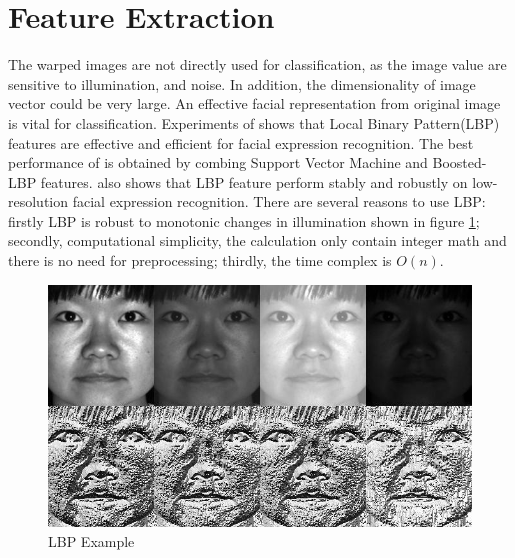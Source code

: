 \section{Feature Extraction}
The warped images are not directly used for classification, as the image value are sensitive to illumination, and noise. In addition, the dimensionality of image vector could be very large. An effective facial representation from original image is vital for classification. Experiments of \cite{shan2009facial} shows that Local Binary Pattern(LBP) features are effective and efficient for facial expression recognition. The best performance of \cite{shan2009facial} is obtained by combing Support Vector Machine and Boosted-LBP features. \cite{shan2009facial} also shows that LBP feature perform stably and robustly on low-resolution facial expression recognition. There are several reasons to use LBP: firstly LBP is robust to monotonic changes in illumination shown in figure \ref{fig:LBPE00}; secondly, computational simplicity, the calculation only contain integer math and there is no need for preprocessing; thirdly, the time complex is $O(n)$.
\begin{figure}[ht]
\centering
\includegraphics[width = .5\textwidth]{imgs/lbp_yale.jpg}
\caption[The LOF caption]{LBP Example\footnotemark}
\label{fig:LBPE00}
\end{figure}
